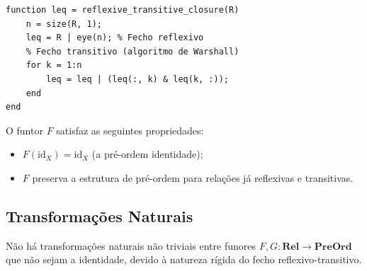 \begin{lstlisting}[style=matlab, caption={Fechamento reflexivo-transitivo}]
function leq = reflexive_transitive_closure(R)
    n = size(R, 1);
    leq = R | eye(n); % Fecho reflexivo
    % Fecho transitivo (algoritmo de Warshall)
    for k = 1:n
        leq = leq | (leq(:, k) & leq(k, :));
    end
end
\end{lstlisting}

\begin{proposition}
O funtor $F$ satisfaz as seguintes propriedades:
\begin{itemize}
    \item $F(\mathrm{id}_X) = \mathrm{id}_X$ (a pré-ordem identidade);
    \item $F$ preserva a estrutura de pré-ordem para relações já reflexivas e transitivas.
\end{itemize}
\end{proposition}

\subsection{Transformações Naturais}

Não há transformações naturais não triviais entre funores $F, G: \mathbf{Rel} \to \mathbf{PreOrd}$ que não sejam a identidade, devido à natureza rígida do fecho reflexivo-transitivo.